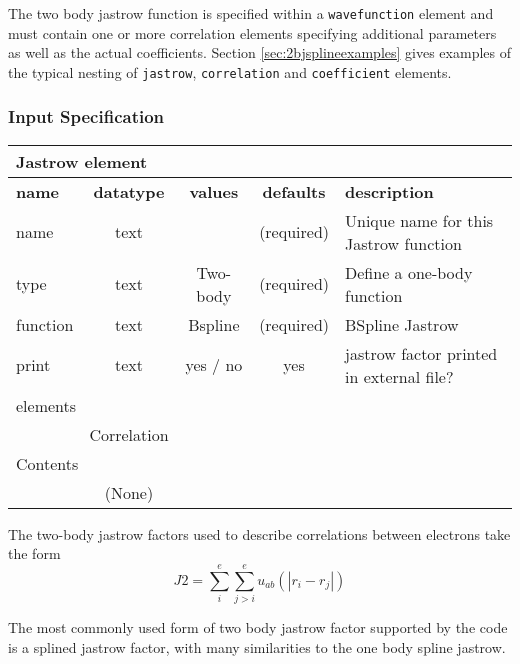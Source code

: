  The two body jastrow function is specified within a \texttt{wavefunction} element
and must contain one or more correlation elements specifying additional parameters
as well as the actual coefficients.  Section \ref{sec:2bjsplineexamples} gives 
examples of the typical nesting of \texttt{jastrow}, \texttt{correlation} and
\texttt{coefficient} elements.

\subsubsection{Input Specification}

\begin{table}[h]
\begin{center}
\begin{tabular}{l c c c l }
\hline
\multicolumn{5}{l}{Jastrow element} \\
\hline
\bfseries name & \bfseries datatype & \bfseries values & \bfseries defaults  & \bfseries description \\
\hline
name & text &    & (required) & Unique name for this Jastrow function \\
type & text & Two-body & (required) & Define a one-body function \\ 
function & text & Bspline & (required) & BSpline Jastrow \\
print & text & yes / no & yes & jastrow factor printed in external file?\\
  \hline
\multicolumn{5}{l}{elements}\\ \hline
& Correlation & & & \\ \hline
\multicolumn{5}{l}{Contents}\\ \hline
& (None)  & & &  \\ \hline
\end{tabular}
\end{center}
\end{table}

The two-body jastrow factors used to describe correlations between electrons take the form
\begin{equation}
J2=\sum_i^{e}\sum_{j>i}^{e} u_{ab}(|r_i-r_j|)
\end{equation}

The most commonly used form of two body jastrow factor supported by the code is a splined
jastrow factor, with many similarities to the one body spline jastrow.



